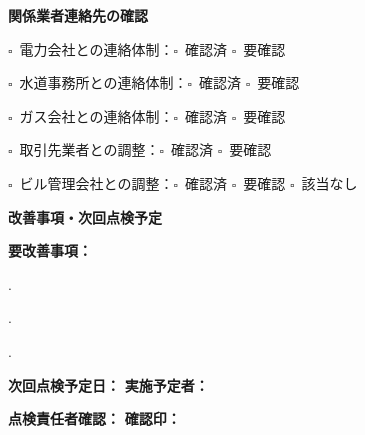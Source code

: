 \documentclass[a4paper,12pt]{jarticle}
\newcommand{\checkbox}{$\square$\ }
\newcommand{\underlinespace}[1]{\underline{\hspace{#1}}}
\begin{document}
\vspace{5mm}

\begin{center}
\textbf{\large 関係業者連絡先の確認}
\end{center}

\vspace{3mm}

\noindent
\checkbox 電力会社との連絡体制：\checkbox 確認済 \quad \checkbox 要確認

\vspace{2mm}

\noindent
\checkbox 水道事務所との連絡体制：\checkbox 確認済 \quad \checkbox 要確認

\vspace{2mm}

\noindent
\checkbox ガス会社との連絡体制：\checkbox 確認済 \quad \checkbox 要確認

\vspace{2mm}

\noindent
\checkbox 取引先業者との調整：\checkbox 確認済 \quad \checkbox 要確認

\vspace{2mm}

\noindent
\checkbox ビル管理会社との調整：\checkbox 確認済 \quad \checkbox 要確認 \quad \checkbox 該当なし

\vspace{8mm}

\begin{center}
\textbf{\large 改善事項・次回点検予定}
\end{center}

\vspace{3mm}

\noindent
\textbf{要改善事項：}

\vspace{2mm}

. \underlinespace{12cm}

\vspace{2mm}

. \underlinespace{12cm}

\vspace{2mm}

. \underlinespace{12cm}

\vspace{3mm}

\noindent
\textbf{次回点検予定日：} \underlinespace{4cm} \quad \textbf{実施予定者：} \underlinespace{4cm}

\vspace{3mm}

\noindent
\textbf{点検責任者確認：} \underlinespace{4cm} \quad \textbf{確認印：} \underlinespace{3cm}
\end{document}
